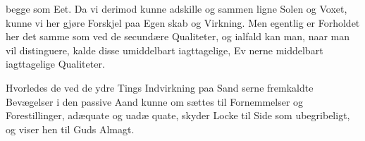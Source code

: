 \documentclass[12pt,a4paper]{book}
\begin{document}
begge som Eet. Da vi derimod kunne adskille og sammen\-%
ligne Solen og Voxet, kunne vi her gjøre Forskjel paa Egen\-%
skab og Virkning. Men egentlig er Forholdet her det samme
som ved de secundære Qualiteter, og ialfald kan man, naar
man vil distinguere, kalde disse umiddelbart iagttagelige, Ev\-%
nerne middelbart iagttagelige Qualiteter.

Hvorledes de ved de ydre Tings Indvirkning paa Sand\-%
serne fremkaldte Bevægelser i den passive Aand kunne om\-%
sættes til Fornemmelser og Forestillinger, adæquate og uadæ\-%
quate, skyder Locke til Side som ubegribeligt, og viser hen til
Guds Almagt.
\end{document}
